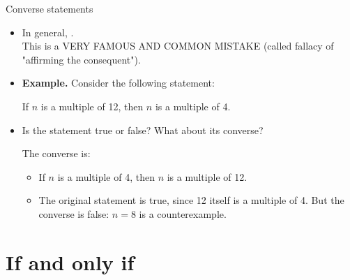 \documentclass[12pt,aspectratio=1610, handout]{beamer}
\begin{document}
\begin{frame}{Converse statements}
	\begin{itemize}\itemsep2mm
		\item In general, . \\\vspace{1mm}This is a VERY FAMOUS AND COMMON MISTAKE (called fallacy of "affirming the consequent"). \p
		\item \textbf{Example.} Consider the following statement: 
		\begin{center}
			If $n$ is a multiple of 12, then $n$ is a multiple of 4.
		\end{center}\p
		\item Is the statement true or false? What about its converse? 
		\begin{solution}The converse is: \p	
			\begin{itemize}
				\item  If $n $ is a multiple of 4, then $n$ is a multiple of 12. \p
				\item The original statement is true, since 12 itself is a multiple of 4. But the converse is false: $n=8$ is a counterexample. 
			\end{itemize}
		\end{solution}
		 
	\end{itemize}
\end{frame}

\section{If and only if}
\end{document}
